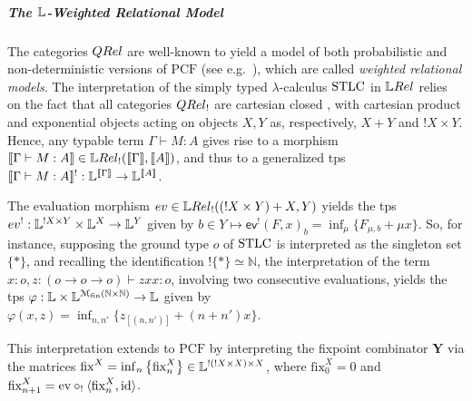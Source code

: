 \subparagraph*{The $\mathbb{L}$-Weighted Relational Model}

The categories $\QREL$ are well-known to yield a model of both probabilistic and non-deterministic versions of $\mathrm{PCF}$ (see e.g.~\cite{Manzo2013, Pagani2018}), which are called \emph{weighted relational models}.
The interpretation of the simply typed $\lambda$-calculus $\mathrm{STLC}$ in $\LREL$ relies on the fact that all categories $\QREL_{!}$ are cartesian closed \cite{Manzo2013}, with cartesian product and exponential objects acting on objects $X,Y$ as, respectively, $X+Y$ and $!X\times Y$. 
Hence, %
any typable term $\Gamma \vdash M:A$ gives rise to a morphism 
$\model{\Gamma \vdash M:A}\in \LREL_{!}(\model{\Gamma}, \model{A})$, and thus to a generalized tps $\llbracket\Gamma \vdash M:A\rrbracket^{!}:\mathbb{L}^{\llbracket\Gamma\rrbracket}\to \mathbb{L}^{\llbracket A\rrbracket}$. 
\begin{example}\label{ex:zxx}
The evaluation morphism $\mathsf{ev}\in\LREL_{!}((!X\times Y) + X, Y)$ yields the tps  
$\mathsf{ev}^{!}: \Lawv^{!X\times Y}\times \Lawv^{X}\to \Lawv^{Y}$ given by 
$b\in Y \mapsto \mathsf{ev}^{!}(F,x)_{b}= \inf_{\mu}\{ F_{\mu,b}+ \mu x\}$. So, for instance, supposing the ground type $o$ of $\mathrm{STLC}$ is interpreted as the singleton set $\{*\}$, and recalling the identification $!\{*\}\simeq \mathbb N$, the interpretation of the term $x:o, z:(o\to o\to o) \vdash zxx:o$, involving two consecutive evaluations, yields the tps $\varphi:\mathbb{L}\times \mathbb{L}^{\mathcal M_{\mathrm{fin}}(\mathbb N\times \mathbb N)}\to \mathbb{L}$ given by $\varphi(x,z)=\inf_{n,n'}\{z_{[(n,n')]}+(n+n')x\}$. 
\end{example}
This interpretation extends to $\mathrm{PCF}$ by interpreting the fixpoint combinator $\mathbf Y$ via the matrices $\mathrm{fix}^{X}= \inf_{n}\big\{\mathrm{fix}^{X}_{n}\big\} \in \mathbb{L}^{  !(!X\times X) \times X  }$, where 
 $\mathrm{fix}^{X}_{0}=0$ and $\mathrm{fix}^{X}_{n+1}= \mathrm{ev}\circ_{!}\langle \mathrm{fix}_{n}^{X}, \mathrm{id} \rangle $.
 
 


